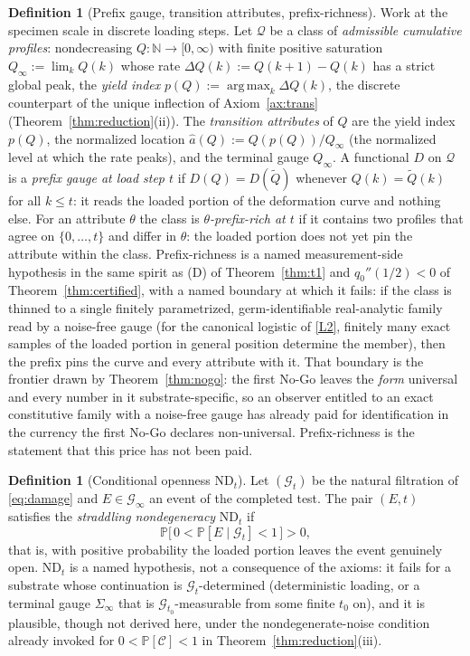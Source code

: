 \documentclass[11pt]{article}
\theoremstyle{plain}
\theoremstyle{definition}
\newtheorem{definition}[theorem]{Definition}
\theoremstyle{remark}
\DeclareMathOperator*{\argmax}{arg\,max}
\newcommand{\N}{\mathbb{N}}
\begin{document}
\begin{definition}[Prefix gauge, transition attributes, prefix-richness]\label{def:prefixrich}
Work at the specimen scale in discrete loading steps. Let $\mathcal Q$ be a class of \emph{admissible cumulative profiles}: nondecreasing $Q:\N\to[0,\infty)$ with finite positive saturation $Q_\infty:=\lim_{k}Q(k)$ whose rate $\Delta Q(k):=Q(k{+}1)-Q(k)$ has a strict global peak, the \emph{yield index} $p(Q):=\argmax_k \Delta Q(k)$, the discrete counterpart of the unique inflection of Axiom~\ref{ax:trans} (Theorem~\ref{thm:reduction}(ii)). The \emph{transition attributes} of $Q$ are the yield index $p(Q)$, the normalized location $\hat a(Q):=Q(p(Q))/Q_\infty$ (the normalized level at which the rate peaks), and the terminal gauge $Q_\infty$. A functional $D$ on $\mathcal Q$ is a \emph{prefix gauge at load step $t$} if $D(Q)=D(\widetilde Q)$ whenever $Q(k)=\widetilde Q(k)$ for all $k\le t$: it reads the loaded portion of the deformation curve and nothing else. For an attribute $\theta$ the class is \emph{$\theta$-prefix-rich at $t$} if it contains two profiles that agree on $\{0,\dots,t\}$ and differ in $\theta$: the loaded portion does not yet pin the attribute within the class. Prefix-richness is a named measurement-side hypothesis in the same spirit as (D) of Theorem~\ref{thm:t1} and $q_0''(1/2)<0$ of Theorem~\ref{thm:certified}, with a named boundary at which it fails: if the class is thinned to a single finitely parametrized, germ-identifiable real-analytic family read by a noise-free gauge (for the canonical logistic of \ref{L2}, finitely many exact samples of the loaded portion in general position determine the member), then the prefix pins the curve and every attribute with it. That boundary is the frontier drawn by Theorem~\ref{thm:nogo}: the first No-Go leaves the \emph{form} universal and every number in it substrate-specific, so an observer entitled to an exact constitutive family with a noise-free gauge has already paid for identification in the currency the first No-Go declares non-universal. Prefix-richness is the statement that this price has not been paid.
\end{definition}

\begin{definition}[Conditional openness $\mathrm{ND}_t$]\label{def:ndt}
Let $(\mathcal G_t)$ be the natural filtration of \eqref{eq:damage} and $E\in\mathcal G_\infty$ an event of the completed test. The pair $(E,t)$ satisfies the \emph{straddling nondegeneracy} $\mathrm{ND}_t$ if
\[
\mathbb P\big[\,0<\mathbb P[E\mid\mathcal G_t]<1\,\big]>0,
\]
that is, with positive probability the loaded portion leaves the event genuinely open. $\mathrm{ND}_t$ is a named hypothesis, not a consequence of the axioms: it fails for a substrate whose continuation is $\mathcal G_t$-determined (deterministic loading, or a terminal gauge $\Sigma_\infty$ that is $\mathcal G_{t_0}$-measurable from some finite $t_0$ on), and it is plausible, though not derived here, under the nondegenerate-noise condition already invoked for $0<\mathbb P[\mathcal C]<1$ in Theorem~\ref{thm:reduction}(iii).
\end{definition}
\end{document}
